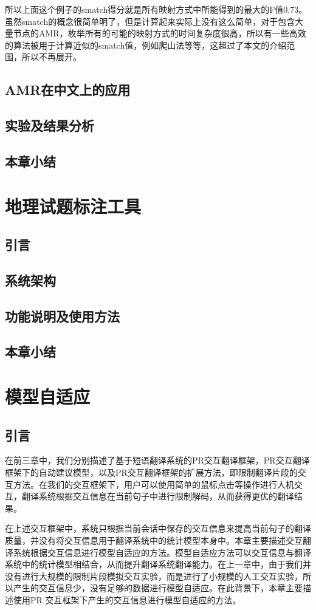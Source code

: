 \documentclass[master, winfont]{njuthesis}
\begin{document}
所以上面这个例子的smatch得分就是所有映射方式中所能得到的最大的F值0.73。虽然smatch的概念很简单明了，但是计算起来实际上没有这么简单，对于包含大量节点的AMR，枚举所有的可能的映射方式的时间复杂度很高，所以有一些高效的算法被用于计算近似的smatch值，例如爬山法等等，这超过了本文的介绍范围，所以不再展开。

\section{AMR在中文上的应用}
\section{实验及结果分析}
\section{本章小结}

\chapter{地理试题标注工具}
\label{chapter:tagger}
\section{引言}
\section{系统架构}
\section{功能说明及使用方法}
\section{本章小结}

\chapter{模型自适应}
\section{引言}
在前三章中，我们分别描述了基于短语翻译系统的PR交互翻译框架，PR交互翻译框架下的自动建议模型，以及PR交互翻译框架的扩展方法，即限制翻译片段的交互方法。在我们的交互框架下，用户可以使用简单的鼠标点击等操作进行人机交互，翻译系统根据交互信息在当前句子中进行限制解码，从而获得更优的翻译结果。

在上述交互框架中，系统只根据当前会话中保存的交互信息来提高当前句子的翻译质量，并没有将交互信息用于翻译系统中的统计模型本身中。本章主要描述交互翻译系统根据交互信息进行模型自适应的方法。模型自适应方法可以交互信息与翻译系统中的统计模型相结合，从而提升翻译系统翻译能力。在上一章中，由于我们并没有进行大规模的限制片段模拟交互实验，而是进行了小规模的人工交互实验，所以产生的交互信息少，没有足够的数据进行模型自适应。在此背景下，本章主要描述使用PR 交互框架下产生的交互信息进行模型自适应的方法。
\end{document}
